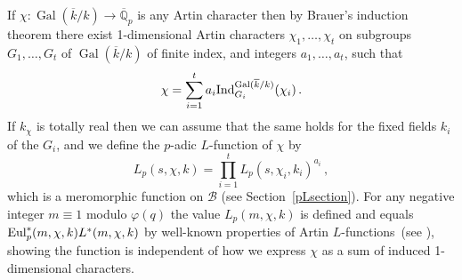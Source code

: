 \documentclass{amsart}
\begin{document}
If $\chi : {\operatorname{Gal}}({\overline{k}}/k) \to {{\overline {\mathbb Q}_p}} $ is any Artin character then by Brauer's induction theorem
\cite[(10.3)]{Neu99}
there exist 1-dimensional Artin characters $\chi_1, \dots,\chi_t$ on subgroups
$ G_1,\dots,G_t $ of $ {\operatorname{Gal}}({\overline{k}}/k) $
of finite index,
and integers $a_1, \dots, a_t$, such that
\begin{equation}\label{brauerinduction}
  \chi = \sum_{i=1}^t a_i {\textup{Ind}_{{G_i}}^{{{\operatorname{Gal}}({\overline{k}}/k)}}}(\chi_i)
\,.
\end{equation}
If $ k_\chi $ is
totally real then we can assume that the same holds for the fixed fields $ k_i $ of the $ G_i $, and
we define the {$p$-adic{\futurelet{}}} {$L$-function{\futurelet{}}} of $\chi$ by
\begin{equation}\label{artinLp}
  {L_{p}(s,{\chi},k)}= \prod_{i=1}^t {L_{p}(s,{\chi_i},k_i)} ^{a_i}
\,,
\end{equation}
which is a meromorphic function on $\mathcal{B}$ (see Section~\ref{pLsection}).  For any 
negative integer $m \equiv 1 $ modulo $ {\varphi(q)} $ the value
$ {L_{p}(m,{\chi},k)}$ is defined and equals
$  {\textup{Eul}}^\ast_p(m,\chi,k) {L^\ast(m,{\chi},k)}$ by well-known properties of Artin
{$L$-functions{\futurelet{}}}~(see \cite[Prop.~10.4(iv)]{Neu99}),
showing the function is independent of how we express $\chi$ as a sum of induced 1-dimensional characters.
\end{document}
